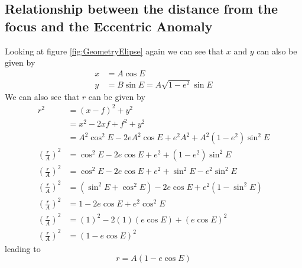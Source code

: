 \subsection{Relationship between the distance from the focus and the Eccentric Anomaly}
Looking at figure \ref{fig:GeometryElipse} again we can see that $x$ and $y$ can also be given by
\begin{align}
x &= A \cos E \label{eq:ElipseXE}\\
y &= B \sin E = A \sqrt{1-e^2} \sin E \label{eq:ElipseYE}
\end{align}
We can also see that $r$ can be given by
\begin{align}
r^2 &= (x-f)^2 + y^2\nonumber \\
&= x^2-2xf+f^2 + y^2\nonumber  \\
&= A^2 \cos^2 E-2eA^2\cos E+e^2A^2 + A^2(1-e^2)\sin^2 E\nonumber  \\
\left(\frac{r}{A}\right)^2 &=  \cos^2 E-2e\cos E+e^2 + (1-e^2)\sin^2 E\nonumber  \\
\left(\frac{r}{A}\right)^2 &=  \cos^2 E-2e\cos E+e^2 + \sin^2 E-e^2\sin^2 E\nonumber  \\
\left(\frac{r}{A}\right)^2 &=  \left(\sin^2 E+\cos^2 E\right)-2e\cos E+e^2(1-\sin^2 E)\nonumber  \\
\left(\frac{r}{A}\right)^2 &=  1-2e\cos E+e^2\cos^2 E\nonumber  \\
\left(\frac{r}{A}\right)^2 &=  (1)^2-2(1)(e\cos E)+(e\cos E)^2\nonumber  \\
\left(\frac{r}{A}\right)^2 &=  \left( 1-e\cos E\right)^2
\end{align}
leading to
\begin{equation}
r = A\left( 1-e\cos E\right) \label{eq:radiusVsEccentric Anomaly}
\end{equation}

